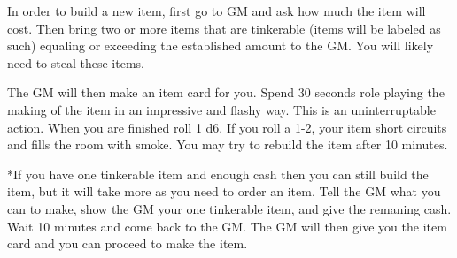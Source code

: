 \documentclass[green]{LRSguildcamp1}
\begin{document}
\name{\gTinkering{}}

In order to build a new item, first go to GM and ask how much the item will cost. Then bring two or more items that are tinkerable (items will be labeled as such) equaling or exceeding the established amount to the GM. You will likely need to steal these items.  

The GM will then make an item card for you. Spend 30 seconds role playing the making of the item in an impressive and flashy way. This is an uninterruptable action. When you are finished roll 1 d6.  If you roll a 1-2, your item short circuits and fills the room with smoke. You may try to rebuild the item after 10 minutes. 

*If you have one tinkerable item and enough cash then you can still build the item, but it will take more as you need to order an item. Tell the GM what you can to make, show the GM your one tinkerable item, and give the remaning cash. Wait 10 minutes and come back to the GM. The GM will then give you the item card and you can proceed to make the item. 

\end{document}
